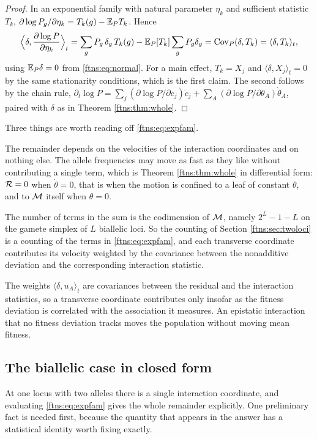 \begin{proof}
In an exponential family with natural parameter $\eta_k$ and sufficient statistic $T_k$,
$\partial \log P_g/\partial\eta_k=T_k(g)-\mathbb{E}_P T_k$. Hence
\[
\Big\langle\delta,\frac{\partial \log P}{\partial\eta_k}\Big\rangle_t
=\sum_g P_g\,\delta_g\,T_k(g)-\mathbb{E}_P[T_k]\sum_gP_g\delta_g
=\operatorname{Cov}_P(\delta,T_k)=\langle\delta,T_k\rangle_t ,
\]
using $\mathbb{E}_P\delta=0$ from \eqref{ftns:eq:normal}. For a main effect, $T_k=X_j$ and
$\langle\delta,X_j\rangle_t=0$ by the same stationarity conditions, which is the first claim. The
second follows by the chain rule, $\partial_t\log P=\sum_j(\partial \log P/\partial c_j)\dot c_j
+\sum_A(\partial \log P/\partial\theta_A)\dot\theta_A$, paired with $\delta$ as in
Theorem \ref{ftns:thm:whole}.
\end{proof}

Three things are worth reading off \eqref{ftns:eq:expfam}.

The remainder depends on the velocities of the interaction coordinates and on nothing else. The
allele frequencies may move as fast as they like without contributing a single term, which is
Theorem \ref{ftns:thm:whole} in differential form: $\mathcal{R}=0$ when $\dot\theta=0$, that is when the motion
is confined to a leaf of constant $\theta$, and to $\mathcal{M}$ itself when $\theta=0$.

The number of terms in the sum is the codimension of $\mathcal{M}$, namely $2^L-1-L$ on the gamete simplex of $L$ biallelic
loci. So the counting of Section \ref{ftns:sec:twoloci} is a counting of the terms in \eqref{ftns:eq:expfam},
and each transverse coordinate contributes its velocity weighted by the covariance between the
nonadditive deviation and the corresponding interaction statistic.

The weights $\langle\delta,u_A\rangle_t$ are covariances between the residual and the interaction
statistics, so a transverse coordinate contributes only insofar as the fitness deviation is
correlated with the association it measures. An epistatic interaction that no fitness deviation
tracks moves the population without moving mean fitness.

\subsection{The biallelic case in closed form}

At one locus with two alleles there is a single interaction coordinate, and evaluating
\eqref{ftns:eq:expfam} gives the whole remainder explicitly. One preliminary fact is needed first,
because the quantity that appears in the answer has a statistical identity worth fixing exactly.

